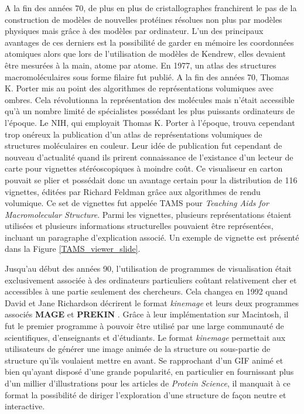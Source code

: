 A la fin des années 70, de plus en plus de cristallographes franchirent le pas de la construction de modèles de nouvelles protéines résolues non plus par modèles physiques mais grâce à des modèles par ordinateur. L'un des principaux avantages de ces derniers est la possibilité de garder en mémoire les coordonnées atomiques alors que lors de l'utilisation de modèles de Kendrew, elles devaient être mesurées à la main, atome par atome. En 1977, un atlas des structures macromoléculaires sous forme filaire fut publié. A la fin des années 70, Thomas K. Porter mis au point des algorithmes de représentations volumiques avec ombres. Cela révolutionna la représentation des molécules mais n'était accessible qu'à un nombre limité de spécialistes possédant les plus puissants ordinateurs de l'époque.
Le NIH, qui employait Thomas K. Porter à l'époque, trouva cependant trop onéreux la publication d'un atlas de représentations volumiques de structures moléculaires en couleur. Leur idée de publication fut cependant de nouveau d'actualité quand ils prirent connaissance de l'existance d'un lecteur de carte pour vignettes stéréoscopiques à moindre coût. Ce visualiseur en carton pouvait se plier et possédait donc un avantage certain pour la distribution de 116 vignettes, éditées par Richard Feldman grâce aux algorithmes de rendu volumique. Ce set de vignettes fut appelée TAMS pour \textit{Teaching Aids for Macromolecular Structure}. Parmi les vignettes, plusieurs représentations étaient utilisées et plusieurs informations structurelles pouvaient être représentées, incluant un paragraphe d'explication associé. Un exemple de vignette est présenté dans la Figure \ref{TAMS_viewer_slide}.


Jusqu'au début des années 90, l'utilisation de programmes de visualisation était exclusivement associée à des ordinateurs particuliers coûtant relativement cher et accessibles à une partie seulement des chercheurs. Cela changea en 1992 quand David et Jane Richardson décrirent le format \textit{kinemage} et leurs deux programmes associés \textbf{MAGE} et \textbf{PREKIN} \cite{richardson1992kinemage}. Grâce à leur implémentation sur Macintosh, il fut le premier programme à pouvoir être utilisé par une large communauté de scientifiques, d'enseignants et d'étudiants. Le format \textit{kinemage} permettait aux utilisateurs de générer une image animée de la structure ou sous-partie de structure qu'ils voulaient mettre en avant. Se rapprochant d'un GIF animé et bien qu'ayant disposé d'une grande popularité, en particulier en fournissant plus d'un millier d'illustrations pour les articles de \textit{Protein Science}, il manquait à ce format la possibilité de diriger l'exploration d'une structure de façon neutre et interactive.


